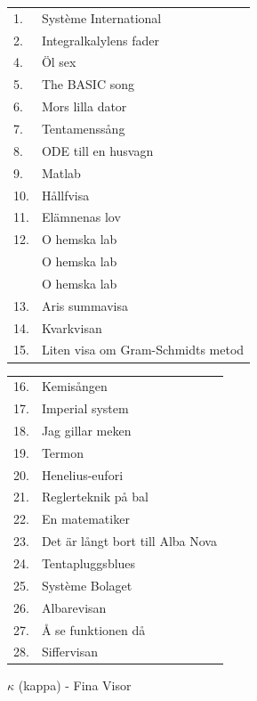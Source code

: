 \documentclass[a6paper,10pt]{article}
\begin{document}
\noindent
\normalsize
\begin{tabularx}{1\textwidth}{l X}
1.&Système International\\
2.&Integralkalylens fader\\
4.&Öl sex\\
5.&The BASIC song\\
6.&Mors lilla dator\\
7.&Tentamenssång\\
8.&ODE till en husvagn\\
9.&Matlab\\
10.&Hållfvisa\\
11.&Elämnenas lov\\
12.&O hemska lab\\
&O hemska lab\\
&O hemska lab\\
13.&Aris summavisa\\
14.&Kvarkvisan\\
15.&Liten visa om Gram-Schmidts metod\\
\end{tabularx}

\noindent
\begin{tabularx}{1\textwidth}{l X}
16.&Kemisången\\
17.&Imperial system\\
18.&Jag gillar meken\\
19.&Termon\\
20.&Henelius-eufori\\
21.&Reglerteknik på bal\\
22.&En matematiker\\
23.&Det är långt bort till Alba Nova\\
24.&Tentapluggsblues\\
25.&Système Bolaget\\
26.&Albarevisan\\
27.&Å se funktionen då\\
28.&Siffervisan
\end{tabularx}

\vspace{5pt}

\noindent \Large $\kappa$ (kappa) - Fina Visor
\end{document}
